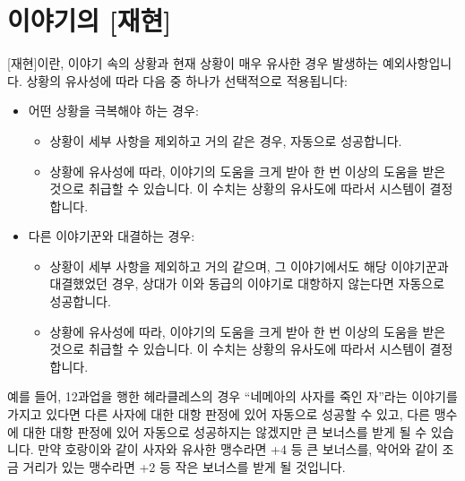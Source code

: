 \documentclass[12pt]{report}
\begin{document}
	\section*{이야기의 [재현]}
	[재현]이란, 이야기 속의 상황과 현재 상황이 매우 유사한 경우 발생하는 예외사항입니다. 상황의 유사성에 따라 다음 중 하나가 선택적으로 적용됩니다:
	\begin{itemize}
		\item 어떤 상황을 극복해야 하는 경우:
		
		\begin{itemize}
			\item 상황이 세부 사항을 제외하고 거의 같은 경우, 자동으로 성공합니다.
			\item 상황에 유사성에 따라, 이야기의 도움을 크게 받아 한 번 이상의 도움을 받은 것으로 취급할 수 있습니다. 이 수치는 상황의 유사도에 따라서 시스템이 결정합니다.
		\end{itemize}
		
		\item 다른 이야기꾼와 대결하는 경우:
		
		\begin{itemize}
			\item 상황이 세부 사항을 제외하고 거의 같으며, 그 이야기에서도 해당 이야기꾼과 대결했었던 경우, 상대가 이와 동급의 이야기로 대항하지 않는다면 자동으로 성공합니다.
			\item 상황에 유사성에 따라, 이야기의 도움을 크게 받아 한 번 이상의 도움을 받은 것으로 취급할 수 있습니다. 이 수치는 상황의 유사도에 따라서 시스템이 결정합니다.
		\end{itemize}
	\end{itemize}
	예를 들어, 12과업을 행한 헤라클레스의 경우 “네메아의 사자를 죽인 자”라는 이야기를 가지고 있다면 다른 사자에 대한 대항 판정에 있어 자동으로 성공할 수 있고, 다른 맹수에 대한 대항 판정에 있어 자동으로 성공하지는 않겠지만 큰 보너스를 받게 될 수 있습니다. 만약 호랑이와 같이 사자와 유사한 맹수라면 +4 등 큰 보너스를, 악어와 같이 조금 거리가 있는 맹수라면 +2 등 작은 보너스를 받게 될 것입니다.
	
\end{document}
